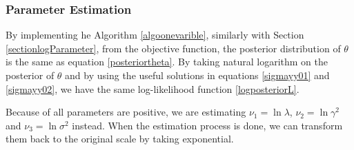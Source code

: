 \subsubsection*{Parameter Estimation}



By implementing he Algorithm \ref{algoonevarible}, similarly with Section \ref{sectionlogParameter}, from the objective function, the posterior distribution of $\theta$ is the same as equation \eqref{posteriortheta}. By taking natural logarithm on the posterior of $\theta$ and by using the useful solutions in equations \eqref{sigmayy01} and \eqref{sigmayy02}, we have the same log-likelihood function \eqref{logposteriorL}.

Because of all parameters are positive, we are estimating $\nu_1=\ln\lambda$, $\nu_2=\ln\gamma^2$ and $\nu_3=\ln\sigma^2$ instead. When the estimation process is done, we can transform them back to the original scale by taking exponential. 

